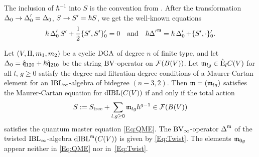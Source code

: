 \documentclass[\MainFolder/Text.tex]{subfiles}
\begin{document}
The inclusion of $\hbar^{-1}$ into $S$ is the convention from \cite{Cieliebak2015}. After the transformation $\operatorname{\Delta}_0 \to \operatorname{\Delta}_0' = \operatorname{\Delta}_0$, $S\to S' = \hbar S$, we get the well-known equations
\begin{equation*}
 \hbar \operatorname{\Delta}_0' S' + \frac{1}{2} \{S',S'\}_0' = 0\quad\text{and}\quad \hbar {\operatorname{\Delta}'}^{\mathfrak{m}}= \hbar \operatorname{\Delta}_0' + \{S',\cdot\}_0'.
\end{equation*} 



\begin{Proposition}\label{Prop:BVActForAnyMCElement}
Let $(V,\Pi,m_1,m_2)$ be a cyclic $\mathrm{DGA}$ of degree $n$ of finite type, and let $\operatorname{\Delta}_0 = \hat{\mathfrak{q}}_{120} + \hbar \hat{\mathfrak{q}}_{210}$ be the string $\mathrm{BV}$-operator on $\mathcal{F}(B(V))$. Let $\mathfrak{m}_{lg}\in \hat{\mathrm{E}}_l C(V)$ for all $l$, $g\ge 0$ satisfy the degree and filtration degree conditions of a Maurer-Cartan element for an $\mathrm{IBL}_\infty$-algebra of bidegree $(n-3,2)$.%
Then $\mathfrak{m} = (\mathfrak{m}_{lg})$ satisfies the Maurer-Cartan equation for $\mathrm{dIBL}(C(V))$ if and only if the total action
\begin{equation}\label{Eq:MyAction}
 S := S_{\mathrm{free}} + \sum_{l,g\ge 0} \mathfrak{m}_{lg} \hbar^{g-1}  \in \mathcal{F}(B(V))
\end{equation}
satisfies the quantum master equation \eqref{Eq:QME}. The $\mathrm{BV}_\infty$-operator $\operatorname{\Delta}^{\mathfrak{m}}$ of the twisted $\mathrm{IBL}_\infty$-algebra $\mathrm{dIBL}^{\mathfrak{m}}(C(V))$ is given by \eqref{Eq:Twist}. The elements $\mathfrak{m}_{0g}$ appear neither in \eqref{Eq:QME} nor in~\eqref{Eq:Twist}.
\end{Proposition}
\end{document}
